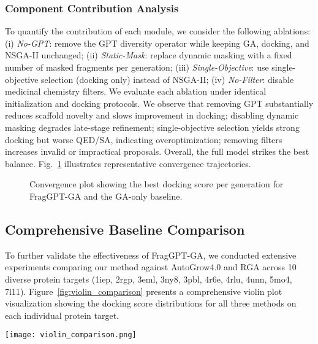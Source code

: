 \documentclass[lettersize,journal]{IEEEtran}
\begin{document}
\subsubsection{Component Contribution Analysis}
To quantify the contribution of each module, we consider the following ablations: (i) \textit{No-GPT}: remove the GPT diversity operator while keeping GA, docking, and NSGA-II unchanged; (ii) \textit{Static-Mask}: replace dynamic masking with a fixed number of masked fragments per generation; (iii) \textit{Single-Objective}: use single-objective selection (docking only) instead of NSGA-II; (iv) \textit{No-Filter}: disable medicinal chemistry filters. We evaluate each ablation under identical initialization and docking protocols. We observe that removing GPT substantially reduces scaffold novelty and slows improvement in docking; disabling dynamic masking degrades late-stage refinement; single-objective selection yields strong docking but worse QED/SA, indicating overoptimization; removing filters increases invalid or impractical proposals. Overall, the full model strikes the best balance. Fig.~\ref{fig:convergence} illustrates representative convergence trajectories.
\begin{figure}[!t]
\centering
\caption{Convergence plot showing the best docking score per generation for FragGPT-GA and the GA-only baseline.}
\label{fig:convergence}
\end{figure}
\subsection{Comprehensive Baseline Comparison}
To further validate the effectiveness of FragGPT-GA, we conducted extensive experiments comparing our method against AutoGrow4.0 and RGA across 10 diverse protein targets (1iep, 2rgp, 3eml, 3ny8, 3pbl, 4r6e, 4rlu, 4unn, 5mo4, 7l11). Figure~\ref{fig:violin_comparison} presents a comprehensive violin plot visualization showing the docking score distributions for all three methods on each individual protein target.

\begin{figure*}[!t]
\centering
\texttt{[image: violin\_comparison.png]}
\caption{Protein-specific docking score comparison across three models. Each subplot represents one protein target, with three violin plots showing the distribution of docking scores for AutoGrow4.0 (green), RGA (pink), and FragGPT-GA (blue). The violin plots display both population density and individual data points with statistical overlays (red lines: means, blue lines: medians). The top-right corner of each subplot shows the best docking score (TOP1) achieved by each model for that specific protein target. FragGPT-GA consistently demonstrates superior performance across most protein targets, achieving the best TOP1 scores while maintaining population diversity.}
\label{fig:violin_comparison}
\end{figure*}
\end{document}

